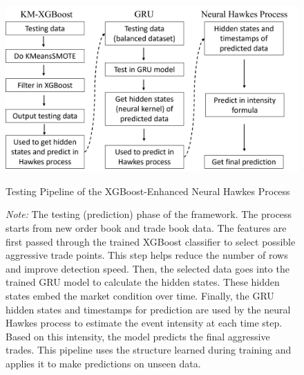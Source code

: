\begin{figure}[h]
    \centering
    \includegraphics[width=0.9\linewidth]{figures/data_flow_test.png} 
    \caption{Testing Pipeline of the XGBoost-Enhanced Neural Hawkes Process}
    \caption*{\textit{Note:} The testing (prediction) phase of the framework. The process starts from new order book and trade book data. The features are first passed through the trained XGBoost classifier to select possible aggressive trade points. This step helps reduce the number of rows and improve detection speed. Then, the selected data goes into the trained GRU model to calculate the hidden states. These hidden states embed the market condition over time. Finally, the GRU hidden states and timestamps for prediction are used by the neural Hawkes process to estimate the event intensity at each time step. Based on this intensity, the model predicts the final aggressive trades. This pipeline uses the structure learned during training and applies it to make predictions on unseen data.}
    \label{fig: data_flow_test} 
\end{figure}





